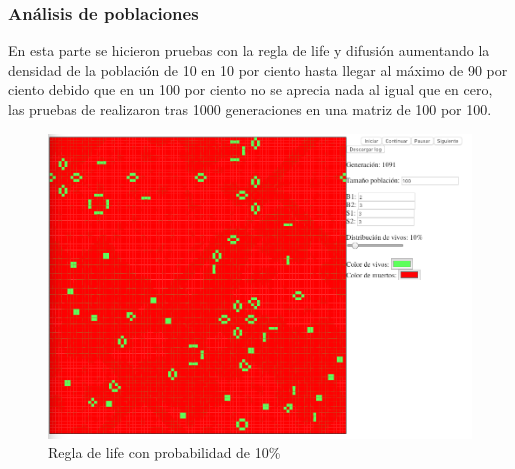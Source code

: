 \subsubsection{Análisis de poblaciones}
	En esta parte se hicieron pruebas con la regla de life y difusión aumentando la densidad de la población de 10 en 10 por ciento hasta llegar al máximo de 90 por ciento debido que en un 100 por ciento no se aprecia nada al igual que en cero, las pruebas de realizaron tras 1000 generaciones en una matriz de 100 por 100.

	\begin{figure}[H]
		\begin{center}
			\includegraphics[scale=.3]{GOL/img/life10-1.png}
			\caption{Regla de life con probabilidad de 10\%}
			\label{fig:gol5}
		\end{center}
	\end{figure}

